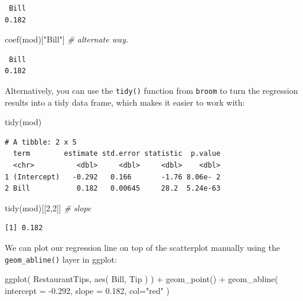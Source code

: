 \documentclass[
  letterpaper,
  DIV=11,
  numbers=noendperiod]{scrreprt}
\newenvironment{Shaded}{}{}
\newcommand{\AttributeTok}[1]{\textcolor[rgb]{0.49,0.56,0.16}{#1}}
\newcommand{\CommentTok}[1]{\textcolor[rgb]{0.38,0.63,0.69}{\textit{#1}}}
\newcommand{\DecValTok}[1]{\textcolor[rgb]{0.25,0.63,0.44}{#1}}
\newcommand{\FloatTok}[1]{\textcolor[rgb]{0.25,0.63,0.44}{#1}}
\newcommand{\FunctionTok}[1]{\textcolor[rgb]{0.02,0.16,0.49}{#1}}
\newcommand{\NormalTok}[1]{#1}
\newcommand{\SpecialCharTok}[1]{\textcolor[rgb]{0.25,0.44,0.63}{#1}}
\newcommand{\StringTok}[1]{\textcolor[rgb]{0.25,0.44,0.63}{#1}}
\begin{document}
\begin{verbatim}
 Bill 
0.182 
\end{verbatim}

\begin{Shaded}
\begin{Highlighting}[]
\FunctionTok{coef}\NormalTok{(mod)[}\StringTok{"Bill"}\NormalTok{] }\CommentTok{\# alternate way.}
\end{Highlighting}
\end{Shaded}

\begin{verbatim}
 Bill 
0.182 
\end{verbatim}

Alternatively, you can use the \texttt{tidy()} function from
\texttt{broom} to turn the regression results into a tidy data frame,
which makes it easier to work with:

\begin{Shaded}
\begin{Highlighting}[]
\FunctionTok{tidy}\NormalTok{(mod)}
\end{Highlighting}
\end{Shaded}

\begin{verbatim}
# A tibble: 2 x 5
  term        estimate std.error statistic  p.value
  <chr>          <dbl>     <dbl>     <dbl>    <dbl>
1 (Intercept)   -0.292   0.166       -1.76 8.06e- 2
2 Bill           0.182   0.00645     28.2  5.24e-63
\end{verbatim}

\begin{Shaded}
\begin{Highlighting}[]
\FunctionTok{tidy}\NormalTok{(mod)[[}\DecValTok{2}\NormalTok{,}\DecValTok{2}\NormalTok{]] }\CommentTok{\# slope}
\end{Highlighting}
\end{Shaded}

\begin{verbatim}
[1] 0.182
\end{verbatim}

We can plot our regression line on top of the scatterplot manually using
the \texttt{geom\_abline()} layer in ggplot:

\begin{Shaded}
\begin{Highlighting}[]
\FunctionTok{ggplot}\NormalTok{( RestaurantTips, }\FunctionTok{aes}\NormalTok{( Bill, Tip ) ) }\SpecialCharTok{+}
  \FunctionTok{geom\_point}\NormalTok{() }\SpecialCharTok{+}
  \FunctionTok{geom\_abline}\NormalTok{( }\AttributeTok{intercept =} \SpecialCharTok{{-}}\FloatTok{0.292}\NormalTok{, }\AttributeTok{slope =}  \FloatTok{0.182}\NormalTok{, }\AttributeTok{col=}\StringTok{"red"}\NormalTok{ )}
\end{Highlighting}
\end{Shaded}
\end{document}
